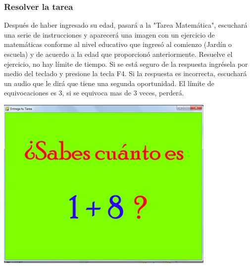\documentclass[12pt]{article}
\begin{document}
{{{\begin{flushleft}
\subsubsection{Resolver la tarea}
\vspace{0.1in}
Después de haber ingresado su edad, pasará a la "Tarea Matemática", escuchará una serie de instrucciones y aparecerá una imagen con un ejercicio de matemáticas conforme al nivel educativo que ingresó al comienzo (Jardín o escuela) y de acuerdo a la edad que proporcionó anteriormente.
Resuelve el ejercicio, no hay límite de tiempo. Si se está seguro de la respuesta ingrésela por medio del teclado y presione la tecla F4.
Si la respuesta es incorrecta, escuchará un audio que le dirá que tiene una segunda oportunidad. El límite de equivocaciones es 3, si se equivoca mas de 3 veces, perderá.
\vspace{0.4in}
	\begin{center}
		\begingroup
			\includegraphics[width=0.8\textwidth]{imagenes_usuario/ejercicio.jpg}
		\endgroup
	\end{center}
\vspace{0.5in}

\end{flushleft}}}}
\end{document}
